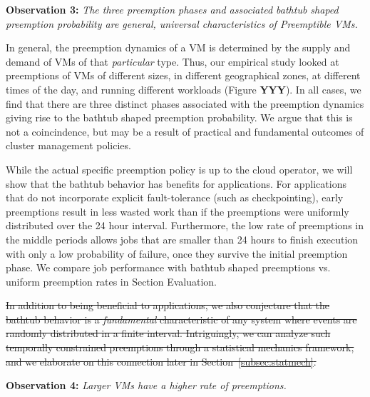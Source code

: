 \noindent \textbf{Observation 3:} \emph{The three preemption phases and associated bathtub shaped preemption probability are general, universal characteristics of Preemptible VMs.}

In general, the preemption dynamics of a VM is determined by the supply and demand of VMs of that \emph{particular} type.
Thus, our empirical study looked at preemptions of VMs of different sizes, in different geographical zones, at different times of the day, and running different workloads (Figure \textbf{YYY}).
In all cases, we find that there are three distinct phases associated with the preemption dynamics giving rise to the bathtub shaped preemption probability. 
We argue that this is not a coincindence, but may be a result of practical and fundamental outcomes of cluster management policies. 

While the actual specific preemption policy is up to the cloud operator, we will show that the bathtub behavior has benefits for applications. 
For applications that do not incorporate explicit fault-tolerance (such as checkpointing), early preemptions result in less wasted work than if the preemptions were uniformly distributed over the 24 hour interval.
Furthermore, the low rate of preemptions in the middle periods allows jobs that are smaller than 24 hours to finish execution with only a low probability of failure, once they survive the initial preemption phase. 
We compare job performance with bathtub shaped preemptions vs. uniform preemption rates in Section Evaluation.


\sout{In addition to being beneficial to applications, we also conjecture that the bathtub behavior is a \emph{fundamental} characteristic of any system where events are randomly distributed in a finite interval.
Intriguingly, we can analyze such temporally constrained preemptions through a statistical mechanics framework, and we elaborate on this connection later in Section~\ref{subsec:statmech}.}


\noindent \textbf{Observation 4:}\emph{ Larger VMs have a higher rate of preemptions.}

